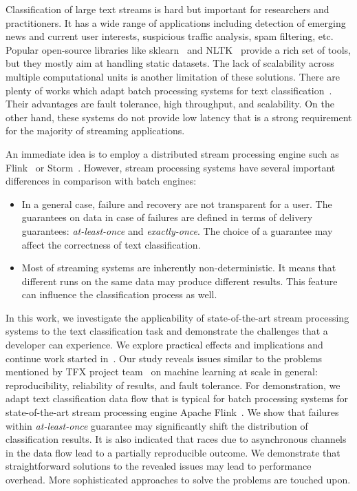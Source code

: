 \label {fs-short-intro}

Classification of large text streams is hard but important for researchers and practitioners. It has a wide range of applications including detection of emerging news and current user interests, suspicious traffic analysis, spam filtering, etc. Popular open-source libraries like sklearn~\cite{scikit-learn} and NLTK~\cite{bird2009natural} provide a rich set of tools, but they mostly aim at handling static datasets. The lack of scalability across multiple computational units is another limitation of these solutions. There are plenty of works which adapt batch processing systems for text classification~\cite{semberecki2016distributed, svyatkovskiy2016large, baltas2016apache}. Their advantages are fault tolerance, high throughput, and scalability. On the other hand, these systems do not provide low latency that is a strong requirement for the majority of streaming applications.

An immediate idea is to employ a distributed stream processing engine such as Flink~\cite{Carbone:2017:SMA:3137765.3137777} or Storm~\cite{apache:storm}. However, stream processing systems have several important differences in comparison with batch engines: 

\begin{itemize}
    \item In a general case, failure and recovery are not transparent for a user. The guarantees on data in case of failures are defined in terms of delivery guarantees: {\em at-least-once} and {\em exactly-once}. The choice of a guarantee may affect the correctness of text classification.
    \item Most of streaming systems are inherently non-deterministic. It means that different runs on the same data may produce different results. This feature can influence the classification process as well.
\end{itemize}

In this work, we investigate the applicability of state-of-the-art stream processing systems to the text classification task and demonstrate the challenges that a developer can experience. We explore practical effects and implications and continue work started in~\cite{we2019debs}. Our study reveals issues similar to the problems mentioned by TFX project team~\cite{Baylor:2017:TTP:3097983.3098021} on machine learning at scale in general: reproducibility, reliability of results, and fault tolerance. For demonstration, we adapt text classification data flow that is typical for batch processing systems for state-of-the-art stream processing engine Apache Flink~\cite{Carbone:2017:SMA:3137765.3137777}. We show that failures within {\em at-least-once} guarantee may significantly shift the distribution of classification results. It is also indicated that races due to asynchronous channels in the data flow lead to a partially reproducible outcome. We demonstrate that straightforward solutions to the revealed issues may lead to performance overhead. More sophisticated approaches to solve the problems are touched upon.

